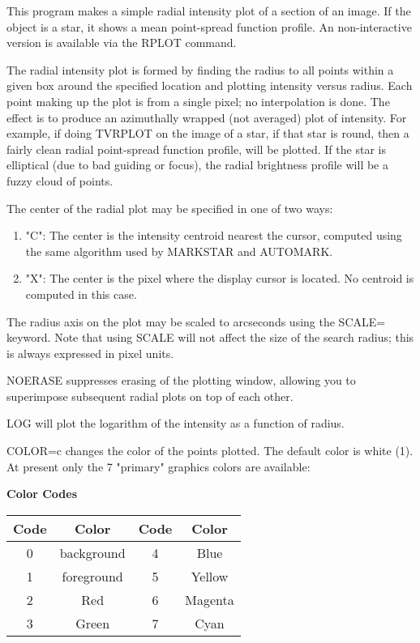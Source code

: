 This program makes a simple radial intensity plot of a section of an image.
If the object is a star, it shows a mean point-spread function profile.  An
non-interactive version is available via the RPLOT command.
 
The radial intensity plot is formed by finding the radius to all points
within a given box around the specified location and plotting intensity
versus radius.  Each point making up the plot is from a single pixel; no
interpolation is done.  The effect is to produce an azimuthally wrapped
(not averaged) plot of intensity.  For example, if doing TVRPLOT on the
image of a star, if that star is round, then a fairly clean radial
point-spread function profile, will be plotted.  If the star is elliptical
(due to bad guiding or focus), the radial brightness profile will be a
fuzzy cloud of points.

The center of the radial plot may be specified in one of two ways:
\begin{enumerate}
  \item{"C": The center is the intensity centroid nearest the 
             cursor, computed using the same algorithm used by MARKSTAR and
             AUTOMARK.}
  \item{"X": The center is the pixel where the display cursor
             is located.  No centroid is computed in this case.}
\end{enumerate}
The radius axis on the plot may be scaled to arcseconds using the SCALE=
keyword.  Note that using SCALE will not affect the size of the search
radius; this is always expressed in pixel units.

NOERASE suppresses erasing of the plotting window, allowing you to
superimpose subsequent radial plots on top of each other.  

LOG will plot the logarithm of the intensity as a function of radius.

COLOR=c changes
the color of the points plotted.  The default color is white (1).  At
present only the 7 "primary" graphics colors are available:

\begin{center}
{\bf Color Codes}\\
\begin{tabular}{cccc}
\hline
Code & Color & Code & Color\\
\hline
0 & background & 4 & Blue\\    
1 & foreground & 5 & Yellow\\  
2 & Red        & 6 & Magenta\\ 
3 & Green      & 7 & Cyan\\    
\hline
\end{tabular}
\end{center}

